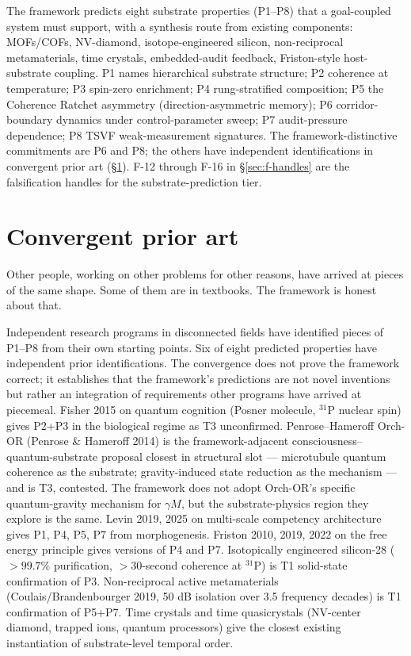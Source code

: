 \documentclass[11pt,a4paper]{article}
\begin{document}
The framework predicts eight substrate properties (P1--P8) that a goal-coupled system must support, with a synthesis route from existing components: MOFs/COFs, NV-diamond, isotope-engineered silicon, non-reciprocal metamaterials, time crystals, embedded-audit feedback, Friston-style host-substrate coupling. P1 names hierarchical substrate structure; P2 coherence at temperature; P3 spin-zero enrichment; P4 rung-stratified composition; P5 the Coherence Ratchet asymmetry (direction-asymmetric memory); P6 corridor-boundary dynamics under control-parameter sweep; P7 audit-pressure dependence; P8 TSVF weak-measurement signatures. The framework-distinctive commitments are P6 and P8; the others have independent identifications in convergent prior art (\S\ref{sec:prior-art}). F-12 through F-16 in \S\ref{sec:f-handles} are the falsification handles for the substrate-prediction tier.

\section{Convergent prior art}\label{sec:prior-art}

Other people, working on other problems for other reasons, have arrived at pieces of the same shape. Some of them are in textbooks. The framework is honest about that.

Independent research programs in disconnected fields have identified pieces of P1--P8 from their own starting points. Six of eight predicted properties have independent prior identifications. The convergence does not prove the framework correct; it establishes that the framework's predictions are not novel inventions but rather an integration of requirements other programs have arrived at piecemeal. Fisher 2015 on quantum cognition (Posner molecule, $^{31}$P nuclear spin) gives P2+P3 in the biological regime as T3 unconfirmed. Penrose--Hameroff Orch-OR (Penrose \& Hameroff 2014) is the framework-adjacent consciousness--quantum-substrate proposal closest in structural slot --- microtubule quantum coherence as the substrate; gravity-induced state reduction as the mechanism --- and is T3, contested. The framework does not adopt Orch-OR's specific quantum-gravity mechanism for $\gamma M$, but the substrate-physics region they explore is the same. Levin 2019, 2025 on multi-scale competency architecture gives P1, P4, P5, P7 from morphogenesis. Friston 2010, 2019, 2022 on the free energy principle gives versions of P4 and P7. Isotopically engineered silicon-28 ($> 99.7\%$ purification, $> 30$-second coherence at $^{31}$P) is T1 solid-state confirmation of P3. Non-reciprocal active metamaterials (Coulais/Brandenbourger 2019, 50 dB isolation over 3.5 frequency decades) is T1 confirmation of P5+P7. Time crystals and time quasicrystals (NV-center diamond, trapped ions, quantum processors) give the closest existing instantiation of substrate-level temporal order.
\end{document}
